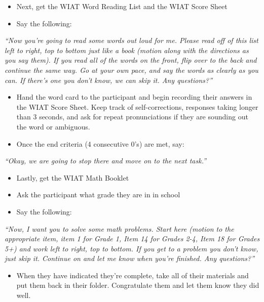 \documentclass[
]{book}
\providecommand{\tightlist}{%
  \setlength{\itemsep}{0pt}\setlength{\parskip}{0pt}}
\begin{document}
\begin{itemize}
\tightlist
\item
  Next, get the WIAT Word Reading List and the WIAT Score Sheet
\item
  Say the following:
\end{itemize}

\emph{``Now you're going to read some words out loud for me. Please read off of this list left to right, top to bottom just like a book (motion along with the directions as you say them). If you read all of the words on the front, flip over to the back and continue the same way. Go at your own pace, and say the words as clearly as you can. If there's one you don't know, we can skip it. Any questions?''}

\begin{itemize}
\tightlist
\item
  Hand the word card to the participant and begin recording their answers in the WIAT Score Sheet. Keep track of self-corrections, responses taking longer than 3 seconds, and ask for repeat pronunciations if they are sounding out the word or ambiguous.
\item
  Once the end criteria (4 consecutive 0's) are met, say:
\end{itemize}

\emph{``Okay, we are going to stop there and move on to the next task.''}

\begin{itemize}
\tightlist
\item
  Lastly, get the WIAT Math Booklet
\item
  Ask the participant what grade they are in in school
\item
  Say the following:
\end{itemize}

\emph{``Now, I want you to solve some math problems. Start here (motion to the appropriate item, item 1 for Grade 1, Item 14 for Grades 2-4, Item 18 for Grades 5+) and work left to right, top to bottom. If you get to a problem you don't know, just skip it. Continue on and let me know when you're finished. Any questions?''}

\begin{itemize}
\tightlist
\item
  When they have indicated they're complete, take all of their materials and put them back in their folder. Congratulate them and let them know they did well.
\end{itemize}
\end{document}

